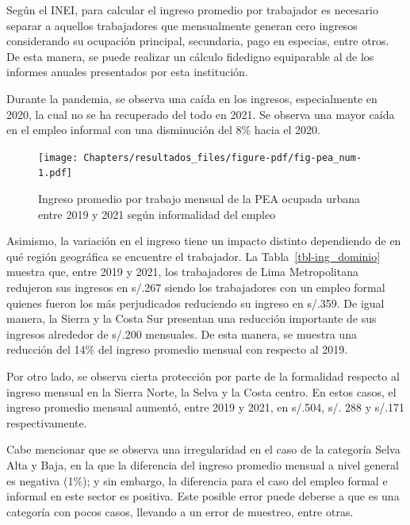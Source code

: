 \documentclass[
  letterpaper,
  12pt,
  oneside,
  spanish,
  doublespacing,
  headsepline,
  parskip]{MastersDoctoralThesis}
\begin{document}
Según el INEI, para calcular el ingreso promedio por trabajador es
necesario separar a aquellos trabajadores que mensualmente generan cero
ingresos considerando su ocupación principal, secundaria, pago en
especias, entre otros. De esta manera, se puede realizar un cálculo
fidedigno equiparable al de los informes anuales presentados por esta
institución.

Durante la pandemia, se observa una caída en los ingresos, especialmente
en 2020, la cual no se ha recuperado del todo en 2021. Se observa una
mayor caída en el empleo informal con una disminución del 8\% hacia el
2020.

\break

\begin{figure}

\caption{\label{fig-pea_num}Ingreso promedio por trabajo mensual de la
PEA ocupada urbana entre 2019 y 2021 según informalidad del empleo}

{\centering \texttt{[image: Chapters/resultados\_files/figure-pdf/fig-pea\_num-1.pdf]}

}

\end{figure}

Asimismo, la variación en el ingreso tiene un impacto distinto
dependiendo de en qué región geográfica se encuentre el trabajador. La
Tabla~\ref{tbl-ing_dominio} muestra que, entre 2019 y 2021, los
trabajadores de Lima Metropolitana redujeron sus ingresos en s/.267
siendo los trabajadores con un empleo formal quienes fueron los más
perjudicados reduciendo su ingreso en s/.359. De igual manera, la Sierra
y la Costa Sur presentan una reducción importante de sus ingresos
alrededor de s/.200 mensuales. De esta manera, se muestra una reducción
del 14\% del ingreso promedio mensual con respecto al 2019.

Por otro lado, se observa cierta protección por parte de la formalidad
respecto al ingreso mensual en la Sierra Norte, la Selva y la Costa
centro. En estos casos, el ingreso promedio mensual aumentó, entre 2019
y 2021, en s/.504, s/. 288 y s/.171 respectivamente.

Cabe mencionar que se observa una irregularidad en el caso de la
categoría Selva Alta y Baja, en la que la diferencia del ingreso
promedio mensual a nivel general es negativa (1\%); y sin embargo, la
diferencia para el caso del empleo formal e informal en este sector es
positiva. Este posible error puede deberse a que es una categoría con
pocos casos, llevando a un error de muestreo, entre otras.
\end{document}
